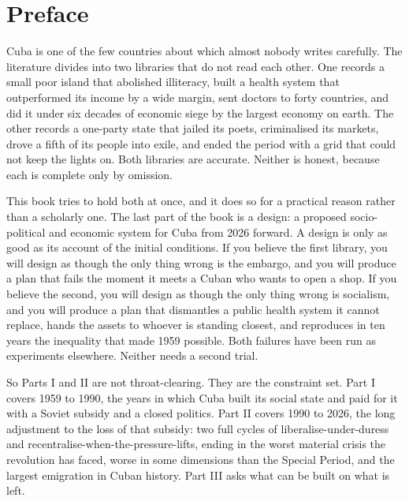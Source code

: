 \chapter*{Preface}

Cuba is one of the few countries about which almost nobody writes carefully.
The literature divides into two libraries that do not read each other. One
records a small poor island that abolished illiteracy, built a health system
that outperformed its income by a wide margin, sent doctors to forty countries,
and did it under six decades of economic siege by the largest economy on earth.
The other records a one-party state that jailed its poets, criminalised its
markets, drove a fifth of its people into exile, and ended the period with a
grid that could not keep the lights on. Both libraries are accurate. Neither is
honest, because each is complete only by omission.

This book tries to hold both at once, and it does so for a practical reason
rather than a scholarly one. The last part of the book is a design: a proposed
socio-political and economic system for Cuba from 2026 forward. A design is
only as good as its account of the initial conditions. If you believe the first
library, you will design as though the only thing wrong is the embargo, and you
will produce a plan that fails the moment it meets a Cuban who wants to open a
shop. If you believe the second, you will design as though the only thing
wrong is socialism, and you will produce a plan that dismantles a public health
system it cannot replace, hands the assets to whoever is standing closest, and
reproduces in ten years the inequality that made 1959 possible. Both failures
have been run as experiments elsewhere. Neither needs a second trial.

So Parts I and II are not throat-clearing. They are the constraint set. Part I
covers 1959 to 1990, the years in which Cuba built its social state and paid
for it with a Soviet subsidy and a closed politics. Part II covers 1990 to
2026, the long adjustment to the loss of that subsidy: two full cycles of
liberalise-under-duress and recentralise-when-the-pressure-lifts, ending in the
worst material crisis the revolution has faced, worse in some dimensions than
the Special Period, and the largest emigration in Cuban history. Part III asks
what can be built on what is left.

